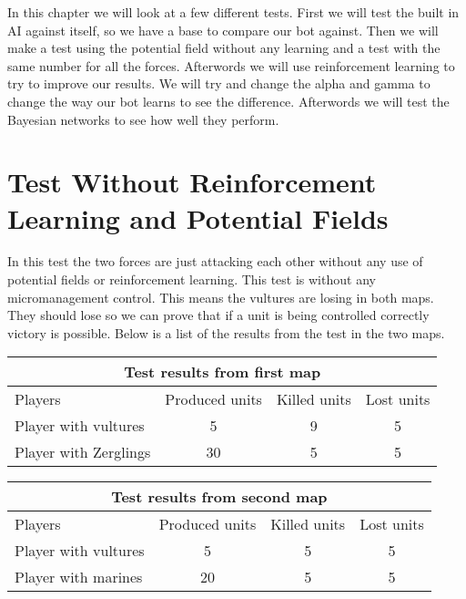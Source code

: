 
In this chapter we will look at a few different tests.
First we will test the built in AI against itself, so we have a base to compare our bot against. Then we will make a test using the potential field without any learning and a test with the same number for all the forces. Afterwords we will use reinforcement learning to try to improve our results. We will try and change the alpha and gamma to change the way our bot learns to see the difference. Afterwords we will test the Bayesian networks to see how well they perform.

\section{Test Without Reinforcement Learning and Potential Fields} %
In this test the two forces are just attacking each other without any use of potential fields or reinforcement learning. This test is without any micromanagement control. This means the vultures are losing in both maps. They should lose so we can prove that if a unit is being controlled correctly victory is possible. Below is a list of the results from the test in the two maps.\\

\begin{centering}
\begin{table}
 \begin{tabular}{|l|c|c|c|}
	\multicolumn{4}{c}{Test results from first map} \\
	\hline
		Players & Produced units & Killed units & Lost units\\
	\hline
	\hline
		Player with vultures & 5 & 9 & 5 \\
	\hline
		Player with Zerglings & 30 & 5 & 5\\
	\hline

\end{tabular}
\end{table}
\end{centering}

\begin{centering}
\begin{table}
 \begin{tabular}{|l|c|c|c|}
	\multicolumn{4}{c}{Test results from second map} \\
	\hline
	Players & Produced units & Killed units & Lost units\\
	\hline
		Player with vultures & 5 & 5 & 5\\
	\hline
		Player with marines & 20 & 5 & 5\\
	\hline

\end{tabular}
\end{table}
\end{centering}

